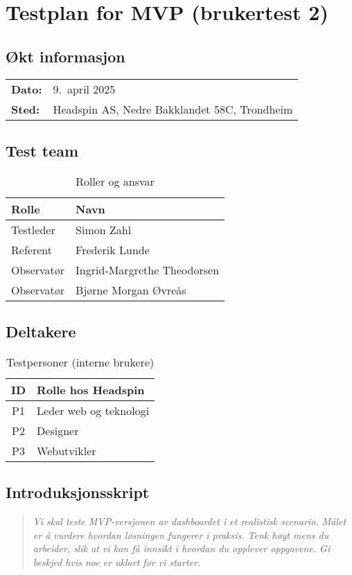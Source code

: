 \section{Testplan for MVP (brukertest 2)}
\label{app:mvp_testplan}

\subsection*{Økt informasjon}
\begin{tabular}{@{}ll@{}}
\textbf{Dato:}   & 9.\ april 2025 \\[2pt]
\textbf{Sted:}   & Headspin AS, Nedre Bakklandet 58C, Trondheim
\end{tabular}

\vspace{1em}
\subsection*{Test team}
\begin{table}[H]
\centering
\caption{Roller og ansvar}
\label{tab:mvp-team}
\begin{tabular}{|l|l|}
\hline
\textbf{Rolle} & \textbf{Navn} \\ \hline
Testleder      & Simon Zahl \\ \hline
Referent       & Frederik Lunde \\ \hline
Observatør     & Ingrid‑Margrethe Theodorsen \\ \hline
Observatør     & Bjørne Morgan Øvreås \\ \hline
\end{tabular}
\end{table}

\subsection*{Deltakere}
\begin{table}[H]
\centering
\caption{Testpersoner (interne brukere)}
\label{tab:mvp-participants}
\begin{tabular}{|c|l|}
\hline
\textbf{ID} & \textbf{Rolle hos Headspin} \\ \hline
P1 & Leder web og teknologi \\ \hline
P2 & Designer \\ \hline
P3 & Webutvikler \\ \hline
\end{tabular}
\end{table}

\subsection*{Introduksjonsskript}
\begin{quote}\itshape
Vi skal teste MVP-versjonen av dashboardet i et realistisk scenario. Målet er å vurdere hvordan løsningen fungerer i praksis. Tenk høyt mens du arbeider, slik at vi kan få innsikt i hvordan du opplever oppgavene. Gi beskjed hvis noe er uklart før vi starter.
\end{quote}


